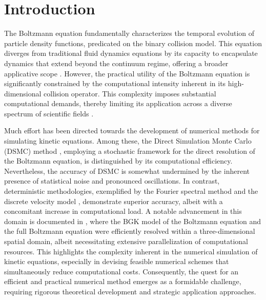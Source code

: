 \documentclass[preprint,12pt]{elsarticle}
\begin{document}
\section{Introduction}
The Boltzmann equation fundamentally characterizes the temporal evolution of particle density functions, predicated on the binary collision model.
This equation diverges from traditional fluid dynamics equations by its capacity to encapsulate dynamics that extend beyond the continuum regime, offering a broader applicative scope \cite{villani2002review, lewis1984computational, markowich2012semiconductor, hazeltine2018framework}.
However, the practical utility of the Boltzmann equation is significantly constrained by the computational intensity inherent in its high-dimensional collision operator.
This complexity imposes substantial computational demands, thereby limiting its application across a diverse spectrum of scientific fields \cite{mieussens2000discrete, filbet2010class, dimarco2014numerical, romano2021openbte}.


Much effort has been directed towards the development of numerical methods for simulating kinetic equations. Among these, the Direct Simulation Monte Carlo (DSMC) method \cite{bird1994molecular}, employing a stochastic framework for the direct resolution of the Boltzmann equation, is distinguished by its computational efficiency.
Nevertheless, the accuracy of DSMC is somewhat undermined by the inherent presence of statistical noise and pronounced oscillations.
In contrast, deterministic methodologies, exemplified by the Fourier spectral method \cite{pareschi1996fourier,pareschi2000numerical,mouhot2006fast, liu2024convergence} and the discrete velocity model \cite{mieussens2000discrete}, demonstrate superior accuracy, albeit with a concomitant increase in computational load.
A notable advancement in this domain is documented in \cite{dimarco2013towards, dimarco2018efficient}, where the BGK model of the Boltzmann equation and the full Boltzmann equation were efficiently resolved within a three-dimensional spatial domain, albeit necessitating extensive parallelization of computational resources. 
This highlights the complexity inherent in the numerical simulation of kinetic equations, especially in devising feasible numerical schemes that simultaneously reduce computational costs.
Consequently, the quest for an efficient and practical numerical method emerges as a formidable challenge, requiring rigorous theoretical development and strategic application approaches.
\end{document}
